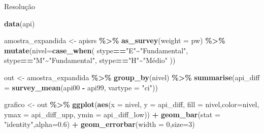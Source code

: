 \documentclass[
  9pt,
  ignorenonframetext,
]{beamer}
\newenvironment{Shaded}{\begin{snugshade}}{\end{snugshade}}
\newcommand{\DataTypeTok}[1]{\textcolor[rgb]{0.13,0.29,0.53}{#1}}
\newcommand{\DecValTok}[1]{\textcolor[rgb]{0.00,0.00,0.81}{#1}}
\newcommand{\FloatTok}[1]{\textcolor[rgb]{0.00,0.00,0.81}{#1}}
\newcommand{\KeywordTok}[1]{\textcolor[rgb]{0.13,0.29,0.53}{\textbf{#1}}}
\newcommand{\NormalTok}[1]{#1}
\newcommand{\OperatorTok}[1]{\textcolor[rgb]{0.81,0.36,0.00}{\textbf{#1}}}
\newcommand{\StringTok}[1]{\textcolor[rgb]{0.31,0.60,0.02}{#1}}
\begin{document}
\begin{frame}[fragile]{Resolução}
\protect\hypertarget{resoluuxe7uxe3o}{}
\begin{Shaded}
\begin{Highlighting}[]
\KeywordTok{data}\NormalTok{(api)}

\NormalTok{amostra\_expandida \textless{}{-}}\StringTok{ }\NormalTok{apisrs }\OperatorTok{\%\textgreater{}\%}\StringTok{ }
\StringTok{  }\KeywordTok{as\_survey}\NormalTok{(}\DataTypeTok{weight =}\NormalTok{ pw) }\OperatorTok{\%\textgreater{}\%}
\StringTok{  }\KeywordTok{mutate}\NormalTok{(}\DataTypeTok{nivel=}\KeywordTok{case\_when}\NormalTok{(}
\NormalTok{    stype}\OperatorTok{==}\StringTok{"E"}\OperatorTok{\textasciitilde{}}\StringTok{"Fundamental"}\NormalTok{,}
\NormalTok{    stype}\OperatorTok{==}\StringTok{"M"}\OperatorTok{\textasciitilde{}}\StringTok{"Fundamental"}\NormalTok{,}
\NormalTok{    stype}\OperatorTok{==}\StringTok{"H"}\OperatorTok{\textasciitilde{}}\StringTok{"Médio"}
\NormalTok{  ))}
\end{Highlighting}
\end{Shaded}
\end{frame}

\begin{frame}[fragile]{}
\protect\hypertarget{section-4}{}
\begin{Shaded}
\begin{Highlighting}[]
\NormalTok{out \textless{}{-}}\StringTok{ }\NormalTok{amostra\_expandida }\OperatorTok{\%\textgreater{}\%}
\StringTok{  }\KeywordTok{group\_by}\NormalTok{(nivel) }\OperatorTok{\%\textgreater{}\%}
\StringTok{  }\KeywordTok{summarise}\NormalTok{(}\DataTypeTok{api\_diff =} 
              \KeywordTok{survey\_mean}\NormalTok{(api00 }\OperatorTok{{-}}\StringTok{ }\NormalTok{api99, }\DataTypeTok{vartype =} \StringTok{"ci"}\NormalTok{))}
\end{Highlighting}
\end{Shaded}
\end{frame}

\begin{frame}[fragile]{}
\protect\hypertarget{section-5}{}
\begin{Shaded}
\begin{Highlighting}[]
\NormalTok{grafico \textless{}{-}}\StringTok{ }\NormalTok{out }\OperatorTok{\%\textgreater{}\%}\StringTok{ }
\StringTok{  }\KeywordTok{ggplot}\NormalTok{(}\KeywordTok{aes}\NormalTok{(}\DataTypeTok{x =}\NormalTok{ nivel, }\DataTypeTok{y =}\NormalTok{ api\_diff, }
             \DataTypeTok{fill =}\NormalTok{ nivel,}\DataTypeTok{color=}\NormalTok{nivel,}
                       \DataTypeTok{ymax =}\NormalTok{ api\_diff\_upp, }
             \DataTypeTok{ymin =}\NormalTok{ api\_diff\_low)) }\OperatorTok{+}
\StringTok{  }\KeywordTok{geom\_bar}\NormalTok{(}\DataTypeTok{stat =} \StringTok{"identity"}\NormalTok{,}\DataTypeTok{alpha=}\FloatTok{0.6}\NormalTok{) }\OperatorTok{+}
\StringTok{  }\KeywordTok{geom\_errorbar}\NormalTok{(}\DataTypeTok{width =} \DecValTok{0}\NormalTok{,}\DataTypeTok{size=}\DecValTok{3}\NormalTok{) }
\end{Highlighting}
\end{Shaded}
\end{frame}
\end{document}

